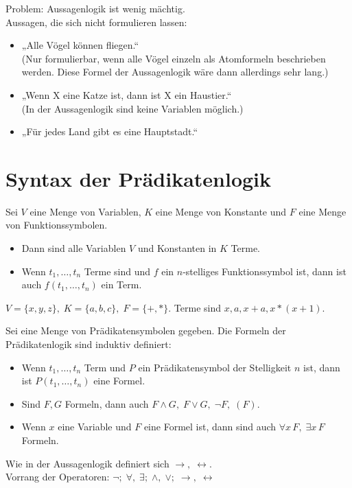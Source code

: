 Problem: Aussagenlogik ist wenig mächtig.\\
Aussagen, die sich nicht formulieren lassen:
\begin{itemize}
\item „Alle Vögel können fliegen.“\\
(Nur formulierbar, wenn alle Vögel einzeln als Atomformeln beschrieben werden. Diese Formel der Aussagenlogik wäre dann allerdings sehr lang.)
\item „Wenn X eine Katze ist, dann ist X ein Haustier.“\\
(In der Aussagenlogik sind keine Variablen möglich.)
\item „Für jedes Land gibt es eine Hauptstadt.“
\end{itemize}

\section{Syntax der Prädikatenlogik}
Sei $V$ eine Menge von Variablen, $K$ eine Menge von Konstante und $F$ eine Menge von Funktionssymbolen.
\begin{itemize}
\item Dann sind alle Variablen $V$ und Konstanten in $K$ Terme.
\item Wenn $t_1, \dots, t_n$ Terme sind und $f$ ein $n$-stelliges Funktionssymbol ist, dann ist auch $f(t_1, \dots, t_n)$ ein Term. 
\end{itemize}

$V=\{x,y,z\},\; K=\{a,b,c\},\; F=\{+,*\}$. Terme sind $x,a,x+a,x*(x+1)$.

Sei eine Menge von Prädikatensymbolen gegeben. Die Formeln der Prädikatenlogik sind induktiv definiert:
\begin{itemize}
\item Wenn $t_1, \dots, t_n$ Term und $P$ ein Prädikatensymbol der Stelligkeit $n$ ist, dann ist $P(t_1, \dots, t_n)$ eine Formel.
\item Sind $F,G$ Formeln, dann auch $F\wedge G, \; F\vee G,\; \neg F,\; (F)$.
\item Wenn $x$ eine Variable und $F$ eine Formel ist, dann sind auch $\forall x \,F, \; \exists x\,F$ Formeln.
\end{itemize}

 Wie in der Aussagenlogik definiert sich $\to, \; \leftrightarrow$.\\
Vorrang der Operatoren: $\neg;\; \forall, \; \exists;\; \wedge, \; \vee;\; \to,\; \leftrightarrow$

